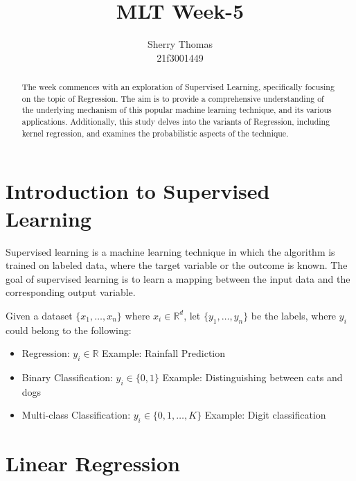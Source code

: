 \documentclass[
]{article}
\author{}
\date{}
\providecommand{\tightlist}{%
  \setlength{\itemsep}{0pt}\setlength{\parskip}{0pt}}
\begin{document}
\title{MLT Week-5}
\author{Sherry Thomas \\ 21f3001449}

\maketitle
\tableofcontents

\begin{abstract}
The week commences with an exploration of Supervised Learning, specifically focusing on the topic of Regression. The aim is to provide a comprehensive understanding of the underlying mechanism of this popular machine learning technique, and its various applications. Additionally, this study delves into the variants of Regression, including kernel regression, and examines the probabilistic aspects of the technique.
\end{abstract}

\hypertarget{introduction-to-supervised-learning}{%
\section{Introduction to Supervised
Learning}\label{introduction-to-supervised-learning}}

Supervised learning is a machine learning technique in which the
algorithm is trained on labeled data, where the target variable or the
outcome is known. The goal of supervised learning is to learn a mapping
between the input data and the corresponding output variable.

Given a dataset \(\{x_1, \ldots, x_n\}\) where \(x_i \in \mathbb{R}^d\),
let \(\{y_1, \ldots, y_n\}\) be the labels, where \(y_i\) could belong
to the following:

\begin{itemize}
\tightlist
\item
  Regression: \(y_i \in \mathbb{R}\) Example: Rainfall Prediction
\item
  Binary Classification: \(y_i \in \{0, 1\}\) Example: Distinguishing
  between cats and dogs
\item
  Multi-class Classification: \(y_i \in \{0, 1, \ldots, K\}\) Example:
  Digit classification
\end{itemize}

\hypertarget{linear-regression}{%
\section{Linear Regression}\label{linear-regression}}
\end{document}
